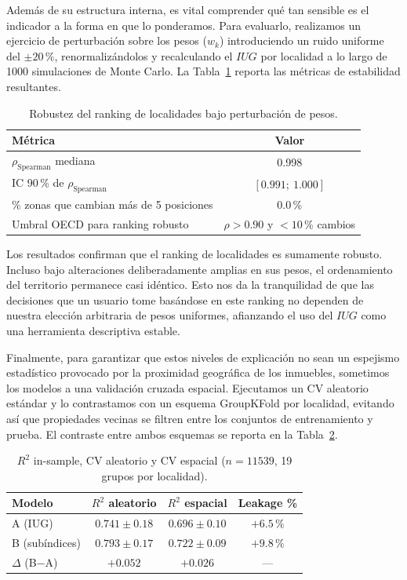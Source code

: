 \documentclass[12pt, a4paper, twoside, openright]{report}
\theoremstyle{plain}
\theoremstyle{definition}
\newcommand{\IUG}{IUG}             %
\begin{document}
Además de su estructura interna, es vital comprender qué tan sensible es el indicador a la forma en que lo ponderamos. Para evaluarlo, realizamos un ejercicio de perturbación sobre los pesos ($w_k$) introduciendo un ruido uniforme del $\pm 20\,\%$, renormalizándolos y recalculando el $\IUG$ por localidad a lo largo de \num{1000} simulaciones de Monte Carlo. La Tabla~\ref{tab:ranking_validez} reporta las métricas de estabilidad resultantes.

\begin{table}[htbp]
\centering
\caption{Robustez del ranking de localidades bajo perturbación de pesos.}
\label{tab:ranking_validez}
\small
\begin{tabular}{@{}lc@{}}
\toprule
\textbf{Métrica} & \textbf{Valor} \\
\midrule
$\rho_{\text{Spearman}}$ mediana & 0.998 \\
IC 90\,\% de $\rho_{\text{Spearman}}$ & $[0.991;\ 1.000]$ \\
\% zonas que cambian más de 5 posiciones & 0.0\,\% \\
Umbral OECD para ranking robusto & $\rho > 0.90$ y $< 10\,\%$ cambios \\
\bottomrule
\end{tabular}
\end{table}

Los resultados confirman que el ranking de localidades es sumamente robusto. Incluso bajo alteraciones deliberadamente amplias en sus pesos, el ordenamiento del territorio permanece casi idéntico. Esto nos da la tranquilidad de que las decisiones que un usuario tome basándose en este ranking no dependen de nuestra elección arbitraria de pesos uniformes, afianzando el uso del $\IUG$ como una herramienta descriptiva estable.

Finalmente, para garantizar que estos niveles de explicación no sean un espejismo estadístico provocado por la proximidad geográfica de los inmuebles, sometimos los modelos a una validación cruzada espacial. Ejecutamos un CV aleatorio estándar y lo contrastamos con un esquema GroupKFold por localidad, evitando así que propiedades vecinas se filtren entre los conjuntos de entrenamiento y prueba. El contraste entre ambos esquemas se reporta en la Tabla~\ref{tab:cv_validez}.

\begin{table}[htbp]
\centering
\caption{$R^2$ in-sample, CV aleatorio y CV espacial ($n = \num{11539}$, 19 grupos por localidad).}
\label{tab:cv_validez}
\small
\begin{tabular}{@{}lccc@{}}
\toprule
\textbf{Modelo} & $R^2$ \textbf{aleatorio} & $R^2$ \textbf{espacial} & \textbf{Leakage \%} \\
\midrule
A (IUG)        & $0.741 \pm 0.18$ & $0.696 \pm 0.10$ & $+6.5\,\%$ \\
B (subíndices) & $0.793 \pm 0.17$ & $0.722 \pm 0.09$ & $+9.8\,\%$ \\
$\Delta$ (B$-$A) & $+0.052$ & $+0.026$ & --- \\
\bottomrule
\end{tabular}
\end{table}
\end{document}
